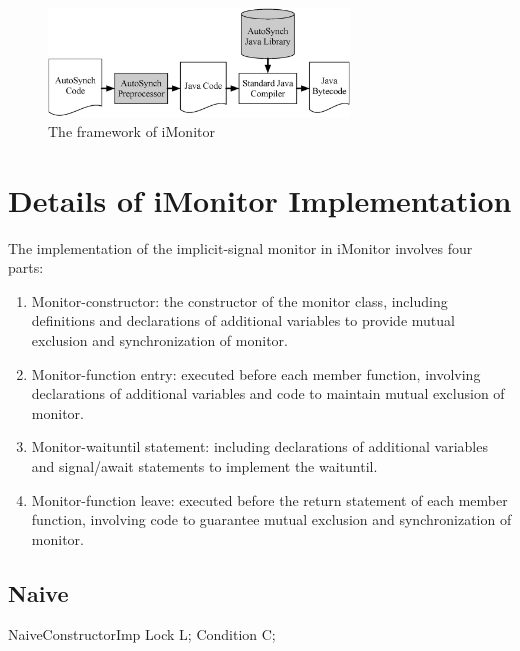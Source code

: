 \documentclass[preprint]{sigplanconf}
\begin{document}
\begin{figure}[ht!]
  \centering
  \includegraphics[width=80mm]{fig/flow.eps}
  \caption{The framework of iMonitor}
  \label{fig:framework}
\end{figure}



\section{Details of iMonitor Implementation} \label{sec:imp}
The implementation of the implicit-signal monitor in iMonitor involves four 
parts:
\begin{enumerate}
  \item Monitor-constructor: the constructor of the monitor class, including 
    definitions and declarations of additional variables to provide mutual 
    exclusion and synchronization of monitor. 
  \item Monitor-function entry: executed before each member function, 
    involving declarations of additional variables and code to maintain
    mutual exclusion of monitor. 
  \item Monitor-waituntil statement: including declarations of additional
    variables and signal/await statements to implement the waituntil.
  \item Monitor-function leave: executed before the return statement of 
    each member function, involving code to guarantee mutual exclusion and 
    synchronization of monitor. 
\end{enumerate}



\subsection{Naive}

\begin{SaveVerbatim}{NaiveConstructorImp}
Lock L;
Condition C;
\end{SaveVerbatim}
\end{document}
